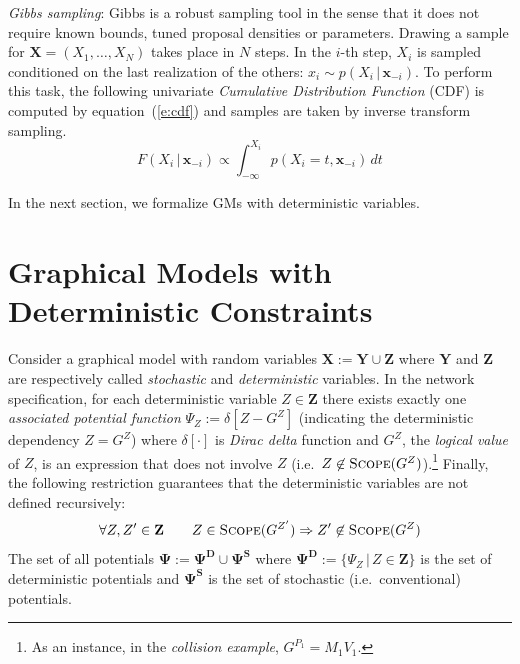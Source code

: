 \documentclass[letterpaper]{article}
\newcommand{\bvec}[1]{\textbf{#1}}
\newcommand{\pr}{p}
\begin{document}
\emph{Gibbs sampling}:
Gibbs is a robust sampling tool in the sense that it does not require known bounds, tuned proposal densities or parameters.
Drawing a sample for $\bvec{X} = (X_1, \ldots, X_N)$ takes place in $N$ steps.
In the $i$-th step, $X_i$ is sampled conditioned on the last realization of the others:
$x_i \sim \pr(X_i \,|\, \bvec{x}_{-i})$. 
To perform this task, the following univariate \emph{Cumulative Distribution Function} (CDF)
is computed by equation~(\ref{e:cdf}) and samples are taken by inverse transform sampling. 
{\footnotesize
\begin{equation}
\label{e:cdf}
F(X_i  \,|\, \bvec{x}_{-i}) 
\propto
\int_{-\infty}^{X_i} \!\!\!\! \pr(X_i = t, \bvec{x}_{-i}) \, d  t
\end{equation} 
}

In the next section, we formalize GMs with deterministic variables. 

\section{Graphical Models with Deterministic Constraints}
Consider a graphical model with random variables $\bvec{X} := \bvec{Y} \cup \bvec{Z}$
where $\bvec{Y}$ and $\bvec{Z}$ are respectively called \emph{stochastic} and \emph{deterministic}  variables.
In the network specification, for each deterministic variable $Z \in \bvec{Z}$ there exists exactly one \emph{associated potential function }
$\Psi_Z := \delta[Z - G^Z]$ (indicating the deterministic dependency $Z = G^Z$)
where $\delta[\cdot]$ is \emph{Dirac delta} function and $G^Z$, the \emph{logical value} of $Z$,  is an expression that does not involve $Z$ (i.e.\ $Z \not\in \textsc{Scope}(G^{Z})$).\footnote{
As an instance, in the \emph{collision example}, $G^{P_1} = M_1 V_1$.
}
Finally, the following restriction guarantees that the deterministic variables are not defined recursively:
\begin{equation*}
\forall Z, Z' \in \bvec{Z} \qquad Z \in \textsc{Scope}(G^{Z'}) \Rightarrow Z' \not\in \textsc{Scope}(G^Z)
\end{equation*}
The set of all potentials $\boldsymbol{\Psi} := \boldsymbol{\Psi^D} \cup \boldsymbol{\Psi^S}$
where
$\boldsymbol{\Psi^D} :=\{\Psi_Z \,|\, Z \in \bvec{Z}\}$ is the set of deterministic potentials
and $\boldsymbol{\Psi^S}$ is the set of stochastic (i.e.\ conventional) potentials. 
\end{document}
